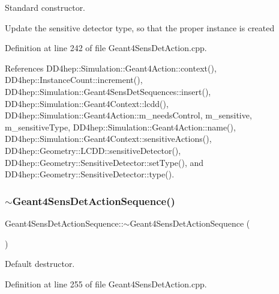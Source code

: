 Standard constructor. 

Update the sensitive detector type, so that the proper instance is created 

Definition at line 242 of file Geant4\+Sens\+Det\+Action.\+cpp.



References D\+D4hep\+::\+Simulation\+::\+Geant4\+Action\+::context(), D\+D4hep\+::\+Instance\+Count\+::increment(), D\+D4hep\+::\+Simulation\+::\+Geant4\+Sens\+Det\+Sequences\+::insert(), D\+D4hep\+::\+Simulation\+::\+Geant4\+Context\+::lcdd(), D\+D4hep\+::\+Simulation\+::\+Geant4\+Action\+::m\+\_\+needs\+Control, m\+\_\+sensitive, m\+\_\+sensitive\+Type, D\+D4hep\+::\+Simulation\+::\+Geant4\+Action\+::name(), D\+D4hep\+::\+Simulation\+::\+Geant4\+Context\+::sensitive\+Actions(), D\+D4hep\+::\+Geometry\+::\+L\+C\+D\+D\+::sensitive\+Detector(), D\+D4hep\+::\+Geometry\+::\+Sensitive\+Detector\+::set\+Type(), and D\+D4hep\+::\+Geometry\+::\+Sensitive\+Detector\+::type().

\hypertarget{class_d_d4hep_1_1_simulation_1_1_geant4_sens_det_action_sequence_a0e8473bdb136ab4eae734fd3305b4f05}{}\label{class_d_d4hep_1_1_simulation_1_1_geant4_sens_det_action_sequence_a0e8473bdb136ab4eae734fd3305b4f05} 
\subsubsection{\texorpdfstring{$\sim$\+Geant4\+Sens\+Det\+Action\+Sequence()}{~Geant4SensDetActionSequence()}}
{\footnotesize\ttfamily Geant4\+Sens\+Det\+Action\+Sequence\+::$\sim$\+Geant4\+Sens\+Det\+Action\+Sequence (\begin{DoxyParamCaption}{ }\end{DoxyParamCaption})\hspace{0.3cm}{\ttfamily [virtual]}}



Default destructor. 



Definition at line 255 of file Geant4\+Sens\+Det\+Action.\+cpp.



